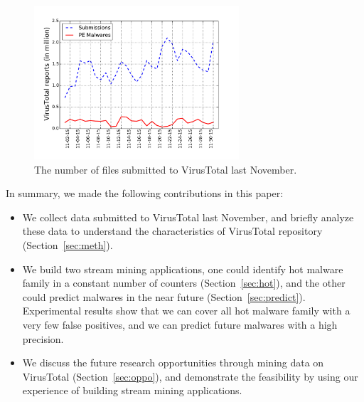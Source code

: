 \begin{figure}[t!]
\begin{center}
\includegraphics[width=3.0in]{figure/nov}
\caption{The number of files submitted to VirusTotal last November. }
\label{fig:subnum}
\end{center}
\end{figure}

In summary, we made the following contributions in this paper:

\begin{itemize}

\item We collect data submitted to VirusTotal last November, 
and briefly analyze these data to understand the characteristics of VirusTotal repository (Section~\ref{sec:meth}). 
\item We build two stream mining applications, one could identify hot malware family in a constant number of counters (Section~\ref{sec:hot}), 
and the other could predict malwares in the near future (Section~\ref{sec:predict}). 
Experimental results show that we can cover all hot malware family with a very few false positives, and we can predict future malwares with a high precision.
\item We discuss the future research opportunities through mining data on VirusTotal (Section~\ref{sec:oppo}), 
and demonstrate the feasibility by using our experience of building stream mining applications. 

\end{itemize}



